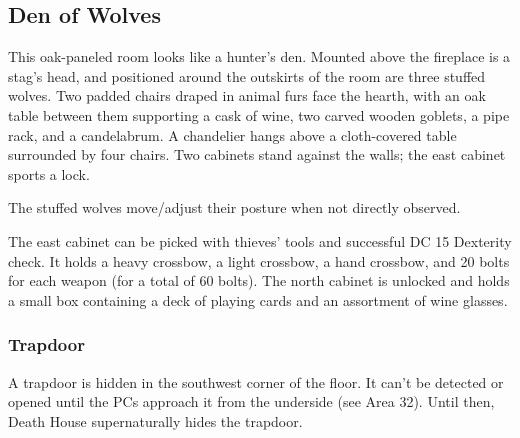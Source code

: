\begin{arealinks}
\end{arealinks}


\pagebreak
\subsection{Den of Wolves}
\label{sec:DenOfWolves}
\begin{readout}
  This oak-paneled room looks like a hunter's den. Mounted above the fireplace is a stag's head, and positioned
  around the outskirts of the room are three stuffed wolves. Two padded chairs draped in animal furs face the
  hearth, with an oak table between them supporting a cask of wine, two carved wooden goblets, a pipe rack, and
  a candelabrum. A chandelier hangs above a cloth-covered table surrounded by four chairs. Two cabinets stand
  against the walls; the east cabinet sports a lock.
\end{readout}
The stuffed wolves move/adjust their posture when not directly observed.

The east cabinet can be picked with thieves' tools and successful DC 15 Dexterity check. It holds a heavy
crossbow, a light crossbow, a hand crossbow, and 20 bolts for each weapon (for a total of 60 bolts). The north
cabinet is unlocked and holds a small box containing a deck of playing cards and an assortment of wine glasses.

\subsubsection*{Trapdoor}
A trapdoor is hidden in the southwest corner of the floor. It can't be detected or opened until the PCs approach
it from the underside (see Area 32). Until then, Death House supernaturally hides the trapdoor.

\begin{arealinks}
\end{arealinks}

